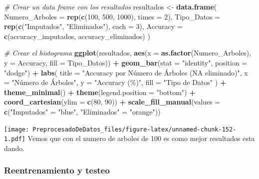 \documentclass[
]{article}
\newenvironment{Shaded}{\begin{snugshade}}{\end{snugshade}}
\newcommand{\AttributeTok}[1]{\textcolor[rgb]{0.13,0.29,0.53}{#1}}
\newcommand{\CommentTok}[1]{\textcolor[rgb]{0.56,0.35,0.01}{\textit{#1}}}
\newcommand{\DecValTok}[1]{\textcolor[rgb]{0.00,0.00,0.81}{#1}}
\newcommand{\FunctionTok}[1]{\textcolor[rgb]{0.13,0.29,0.53}{\textbf{#1}}}
\newcommand{\NormalTok}[1]{#1}
\newcommand{\OtherTok}[1]{\textcolor[rgb]{0.56,0.35,0.01}{#1}}
\newcommand{\SpecialCharTok}[1]{\textcolor[rgb]{0.81,0.36,0.00}{\textbf{#1}}}
\newcommand{\StringTok}[1]{\textcolor[rgb]{0.31,0.60,0.02}{#1}}
\begin{document}
\begin{Shaded}
\begin{Highlighting}[]
\CommentTok{\# Crear un data frame con los resultados}
\NormalTok{resultados }\OtherTok{\textless{}{-}} \FunctionTok{data.frame}\NormalTok{(}
  \AttributeTok{Numero\_Arboles =} \FunctionTok{rep}\NormalTok{(}\FunctionTok{c}\NormalTok{(}\DecValTok{100}\NormalTok{, }\DecValTok{500}\NormalTok{, }\DecValTok{1000}\NormalTok{), }\AttributeTok{times =} \DecValTok{2}\NormalTok{),}
  \AttributeTok{Tipo\_Datos =} \FunctionTok{rep}\NormalTok{(}\FunctionTok{c}\NormalTok{(}\StringTok{"Imputados"}\NormalTok{, }\StringTok{"Eliminados"}\NormalTok{), }\AttributeTok{each =} \DecValTok{3}\NormalTok{),}
  \AttributeTok{Accuracy =} \FunctionTok{c}\NormalTok{(accuracy\_imputados, accuracy\_eliminados)}
\NormalTok{)}


\CommentTok{\# Crear el histograma}
\FunctionTok{ggplot}\NormalTok{(resultados, }\FunctionTok{aes}\NormalTok{(}\AttributeTok{x =} \FunctionTok{as.factor}\NormalTok{(Numero\_Arboles), }\AttributeTok{y =}\NormalTok{ Accuracy, }\AttributeTok{fill =}\NormalTok{ Tipo\_Datos)) }\SpecialCharTok{+}
  \FunctionTok{geom\_bar}\NormalTok{(}\AttributeTok{stat =} \StringTok{"identity"}\NormalTok{, }\AttributeTok{position =} \StringTok{"dodge"}\NormalTok{) }\SpecialCharTok{+}
  \FunctionTok{labs}\NormalTok{(}
    \AttributeTok{title =} \StringTok{"Accuracy por Número de Árboles (NA eliminado)"}\NormalTok{,}
    \AttributeTok{x =} \StringTok{"Número de Árboles"}\NormalTok{,}
    \AttributeTok{y =} \StringTok{"Accuracy (\%)"}\NormalTok{,}
    \AttributeTok{fill =} \StringTok{"Tipo de Datos"}
\NormalTok{  ) }\SpecialCharTok{+}
  \FunctionTok{theme\_minimal}\NormalTok{() }\SpecialCharTok{+}
  \FunctionTok{theme}\NormalTok{(}\AttributeTok{legend.position =} \StringTok{"bottom"}\NormalTok{) }\SpecialCharTok{+}
  \FunctionTok{coord\_cartesian}\NormalTok{(}\AttributeTok{ylim =} \FunctionTok{c}\NormalTok{(}\DecValTok{80}\NormalTok{, }\DecValTok{90}\NormalTok{)) }\SpecialCharTok{+}
  \FunctionTok{scale\_fill\_manual}\NormalTok{(}\AttributeTok{values =} \FunctionTok{c}\NormalTok{(}\StringTok{"Imputados"} \OtherTok{=} \StringTok{"blue"}\NormalTok{, }\StringTok{"Eliminados"} \OtherTok{=} \StringTok{"orange"}\NormalTok{))}
\end{Highlighting}
\end{Shaded}

\texttt{[image: PreprocesadoDeDatos\_files/figure-latex/unnamed-chunk-152-1.pdf]}
Vemos que con el numero de arboles de 100 es como mejor resultados esta
dando.

\hypertarget{reentrenamiento-y-testeo}{%
\subsubsection{Reentrenamiento y
testeo}\label{reentrenamiento-y-testeo}}
\end{document}
